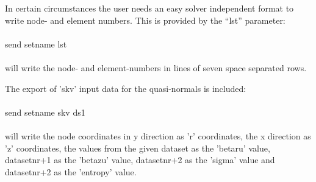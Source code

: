 \documentclass{article}
\begin{document}
In certain circumstances the user needs an easy solver independent format to write node- and element numbers. This is provided by the ``lst'' parameter:\\\\send setname lst\\\\will write the node- and element-numbers in lines of seven space separated rows.

The export of 'skv' input data for the quasi-normals is included:\\\\send setname skv ds1\\\\will write the node coordinates in y direction as 'r' coordinates, the x direction as 'z' coordinates, the values from the given dataset as the 'betaru' value, datasetnr+1  as the 'betazu' value, datasetnr+2  as the 'sigma' value and datasetnr+2  as the 'entropy' value.
\end{document}
